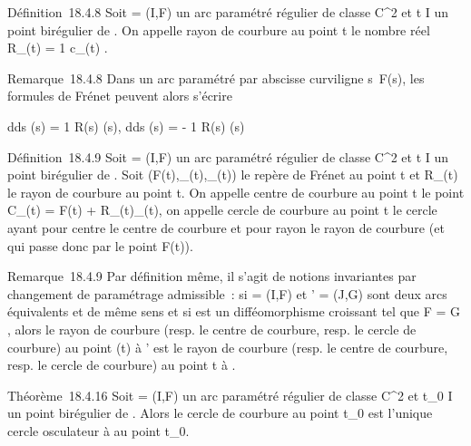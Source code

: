 \documentclass[]{article}
\begin{document}
Définition~18.4.8 Soit \Gamma = (I,F) un arc paramétré régulier de classe
C^2 et t \in I un point birégulier de \Gamma. On appelle rayon de
courbure au point t le nombre réel R_\Gamma(t) = 1
\over c_\Gamma(t) .

Remarque~18.4.8 Dans un arc paramétré par abscisse curviligne
s\mapsto~F(s), les formules de Frénet peuvent alors
s'écrire

 d\vect \over ds (s) = 1
\over R(s) \vecn(s),
d\vecn \over ds (s) = - 1
\over R(s) \vect(s)

Définition~18.4.9 Soit \Gamma = (I,F) un arc paramétré régulier de classe
C^2 et t \in I un point birégulier de \Gamma. Soit
(F(t),\vect_\Gamma(t),\vecn_\Gamma(t))
le repère de Frénet au point t et R_\Gamma(t) le rayon de courbure
au point t. On appelle centre de courbure au point t le point
C_\Gamma(t) = F(t) +
R_\Gamma(t)\vecn_\Gamma(t), on appelle cercle
de courbure au point t le cercle ayant pour centre le centre de courbure
et pour rayon le rayon de courbure (et qui passe donc par le point
F(t)).

Remarque~18.4.9 Par définition même, il s'agit de notions invariantes
par changement de paramétrage admissible~: si \Gamma = (I,F) et \Gamma' = (J,G)
sont deux arcs équivalents et de même sens et si \theta est un
difféomorphisme croissant tel que F = G \cdot \theta, alors le rayon de courbure
(resp. le centre de courbure, resp. le cercle de courbure) au point \theta(t)
à \Gamma' est le rayon de courbure (resp. le centre de courbure, resp. le
cercle de courbure) au point t à \Gamma.

Théorème~18.4.16 Soit \Gamma = (I,F) un arc paramétré régulier de classe
C^2 et t_0 \in I un point birégulier de \Gamma. Alors le
cercle de courbure au point t_0 est l'unique cercle osculateur
à \Gamma au point t_0.
\end{document}
